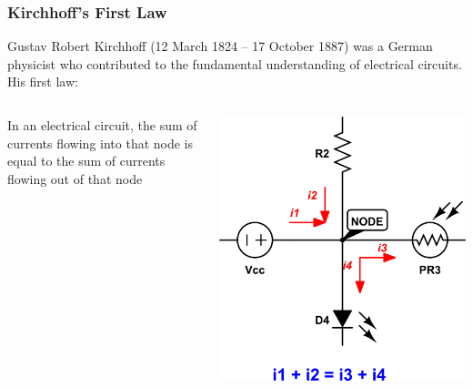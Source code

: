 \documentclass{beamer}
\begin{document}
\begin{frame}
\frametitle{Kirchhoff's First Law}
Gustav Robert Kirchhoff (12 March 1824 – 17 October 1887) was a German physicist who contributed to the fundamental understanding of electrical circuits. His first law:
\begin{columns}
\begin{column}{5cm}
In an electrical circuit, the sum of currents flowing into that node is equal to the sum of currents flowing out of that node
\end{column}
\begin{column}{4cm}
\begin{overprint}
\includegraphics[scale=0.25]{fig/KFL2.png}
\end{overprint}
\end{column}
\end{columns}
\end{frame}
\end{document}

